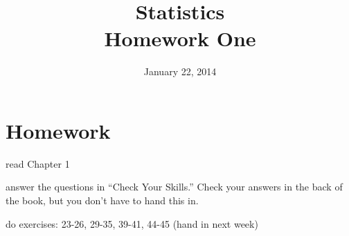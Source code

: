 \documentclass[letterpaper, landscape]{exam}
\title{Statistics \\ Homework One}
\author{}
\date{January 22, 2014}
\begin{document}
  \maketitle

  \section{Homework}
    \begin{itemize*}
      \item read Chapter 1 
      \item answer the questions in ``Check Your Skills.''  Check your answers
        in the back of the book, but you don't have to hand this in.
      \item do exercises: 23-26, 29-35, 39-41, 44-45 (hand in next week)
    \end{itemize*}

  \ifprintanswers
\end{document}
